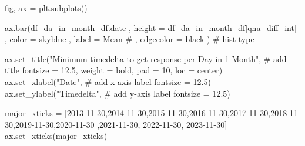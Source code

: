 \documentclass[
  letterpaper,
  DIV=11,
  numbers=noendperiod]{scrartcl}
\newenvironment{Shaded}{\begin{snugshade}}{\end{snugshade}}
\newcommand{\CommentTok}[1]{\textcolor[rgb]{0.37,0.37,0.37}{#1}}
\newcommand{\DecValTok}[1]{\textcolor[rgb]{0.68,0.00,0.00}{#1}}
\newcommand{\FloatTok}[1]{\textcolor[rgb]{0.68,0.00,0.00}{#1}}
\newcommand{\NormalTok}[1]{\textcolor[rgb]{0.00,0.23,0.31}{#1}}
\newcommand{\OperatorTok}[1]{\textcolor[rgb]{0.37,0.37,0.37}{#1}}
\newcommand{\StringTok}[1]{\textcolor[rgb]{0.13,0.47,0.30}{#1}}
\begin{document}
\begin{Shaded}
\begin{Highlighting}[]
\NormalTok{fig, ax }\OperatorTok{=}\NormalTok{ plt.subplots()}

\NormalTok{ax.bar(df\_da\_in\_month\_df.date}
\NormalTok{    ,  height }\OperatorTok{=}\NormalTok{ df\_da\_in\_month\_df[}\StringTok{\textquotesingle{}qna\_diff\_int\textquotesingle{}}\NormalTok{]}
\NormalTok{    ,  color }\OperatorTok{=} \StringTok{\textquotesingle{}skyblue\textquotesingle{}}
\NormalTok{    ,  label }\OperatorTok{=} \StringTok{\textquotesingle{}Mean\textquotesingle{}}
    \CommentTok{\# ,  edgecolor = \textquotesingle{}black\textquotesingle{}}
\NormalTok{      ) }\CommentTok{\# hist type}

\NormalTok{ax.set\_title(}\StringTok{"Minimum timedelta to get response per Day in 1 Month"}\NormalTok{, }\CommentTok{\# add title}
\NormalTok{             fontsize }\OperatorTok{=} \FloatTok{12.5}\NormalTok{,}
\NormalTok{             weight }\OperatorTok{=} \StringTok{\textquotesingle{}bold\textquotesingle{}}\NormalTok{,}
\NormalTok{             pad }\OperatorTok{=} \DecValTok{10}\NormalTok{,}
\NormalTok{             loc }\OperatorTok{=} \StringTok{\textquotesingle{}center\textquotesingle{}}\NormalTok{)}
\NormalTok{ax.set\_xlabel(}\StringTok{"Date"}\NormalTok{, }\CommentTok{\# add x{-}axis label}
\NormalTok{              fontsize }\OperatorTok{=} \FloatTok{12.5}\NormalTok{)}
\NormalTok{ax.set\_ylabel(}\StringTok{"Timedelta"}\NormalTok{, }\CommentTok{\# add y{-}axis label}
\NormalTok{              fontsize }\OperatorTok{=} \FloatTok{12.5}\NormalTok{)}

\NormalTok{major\_xticks }\OperatorTok{=}\NormalTok{ [}\StringTok{\textquotesingle{}2013{-}11{-}30\textquotesingle{}}\NormalTok{,}\StringTok{\textquotesingle{}2014{-}11{-}30\textquotesingle{}}\NormalTok{,}\StringTok{\textquotesingle{}2015{-}11{-}30\textquotesingle{}}\NormalTok{,}\StringTok{\textquotesingle{}2016{-}11{-}30\textquotesingle{}}\NormalTok{,}\StringTok{\textquotesingle{}2017{-}11{-}30\textquotesingle{}}\NormalTok{,}\StringTok{\textquotesingle{}2018{-}11{-}30\textquotesingle{}}\NormalTok{,}\StringTok{\textquotesingle{}2019{-}11{-}30\textquotesingle{}}\NormalTok{,}\StringTok{\textquotesingle{}2020{-}11{-}30\textquotesingle{}}
\NormalTok{                ,}\StringTok{\textquotesingle{}2021{-}11{-}30\textquotesingle{}}\NormalTok{, }\StringTok{\textquotesingle{}2022{-}11{-}30\textquotesingle{}}\NormalTok{, }\StringTok{\textquotesingle{}2023{-}11{-}30\textquotesingle{}}\NormalTok{]}
\NormalTok{ax.set\_xticks(major\_xticks)}


\end{Highlighting}
\end{Shaded}
\end{document}
